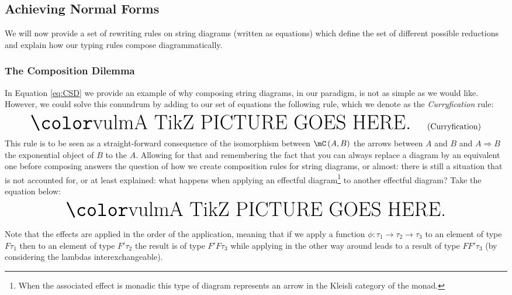 \subsection{Achieving Normal Forms}
\label{subsec:normalforms}
We will now provide a set of rewriting rules on string diagrams (written as equations) which define the set of different possible reductions and explain how our typing rules compose diagrammatically.

\subsubsection{The Composition Dilemma}
\label{subsubsec:cds}
In Equation \eqref{eq:CSD} we provide an example of why composing string diagrams, in our paradigm, is not as simple as we would like.
However, we could solve this conundrum by adding to our set of equations the following rule, which we denote as the \emph{Curryfication} rule:
\begin{equation}
	\inputtikz{sd-curry}
	\label{eq:curry}\tag{Curryfication}
\end{equation}
This rule is to be seen as a straight-forward consequence of the isomorphism between $\mC\left( A, B\right)$
the arrows between $A$ and $B$ and $A \Rightarrow B$ the exponential object of $B$ to the $A$.
Allowing for that and remembering the fact that you can always replace a diagram by an equivalent one
before composing answers the question of how we create composition rules for string diagrams, or almost:
there is still a situation that is not accounted for, or at least explained:
what happens when applying an effectful diagram\footnote{When the associated effect is monadic this
	type of diagram represents an arrow in the Kleisli category of the monad.} to another effectful diagram?
Take the equation below:
\begin{equation*}
	\inputtikz{sd-kleisli-composition}
\end{equation*}

Note that the effects are applied in the order of the application, meaning that if we apply a function
$\phi: \tau_{1} \to \tau_{2} \to \tau_{3}$ to an element of type $F\tau_{1}$ then to an element of
type $F'\tau_{2}$ the result is of type $F'F\tau_{3}$ while applying in the other way around leads to
a result of type $FF'\tau_{3}$ (by considering the lambdas interexchangeable).

